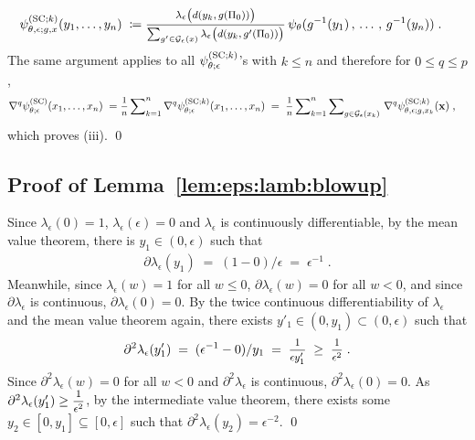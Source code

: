 \begin{align*}
    \psiSCk_{\theta,\epsilon;g,x}
    (y_1, \ldots, y_n)
    \;\coloneqq&\;
    \mfrac{
        \lambda_\epsilon
        \big(  d( y_k, g(\Pi_0)) \big) 
    }{
        \sum_{g' \in \cG_\epsilon(x)}
        \lambda_\epsilon
        \big(  d( y_k, g'(\Pi_0))  \big) 
    }
    \,
    \psi_\theta( g^{-1}(y_1) \,,\, \ldots \,,\, g^{-1}(y_n) )
    \;.
\end{align*}
The same argument applies to all $\psi^{({\rm SC};k)}_{\theta;\epsilon}$'s with $k \leq n$ and therefore for $0 \leq q \leq p$,
\begin{align*}
    \nabla^q 
    \psiSC_{\theta;\epsilon}(x_1, \ldots, x_n)
    \;=&\;
    \mfrac{1}{n} \msum_{k=1}^n 
    \nabla^q 
    \psiSCk_{\theta;\epsilon}(x_1, \ldots, x_n)
    \;=\;
    \mfrac{1}{n}
    \msum_{k=1}^n
    \msum_{g \in \cG_\epsilon(x_k)}
    \,
    \nabla^q 
    \psiSCk_{\theta,\epsilon;g,x_k}
    (\bx)\;,
\end{align*}
which proves (iii). \qed

\subsection{Proof of Lemma~\ref{lem:eps:lamb:blowup}} 

Since $\lambda_\epsilon(0) = 1$, $\lambda_\epsilon(\epsilon) = 0$ and $\lambda_\epsilon$ is continuously differentiable, by the mean value theorem, there is $y_1 \in (0, \epsilon)$ such that 
\begin{align*}
    \partial\lambda_\epsilon(y_1) \;=\; (1-0)/ \epsilon \;=\; \epsilon^{-1}   \;.
\end{align*}    
Meanwhile, since $\lambda_\epsilon(w) = 1$ for  all $w \leq 0$, $\partial \lambda_\epsilon(w) = 0$ for  all $w < 0$, and since $\partial \lambda_\epsilon$ is continuous, $\partial \lambda_\epsilon(0) = 0$. By the twice continuous differentiability of $\lambda_\epsilon$ and the mean value theorem again, there exists $y'_1 \in (0, y_1) \subset (0, \epsilon)$ such that 
\begin{align*}
    \partial^2 \lambda_\epsilon(y'_1) \;=\; (\epsilon^{-1}-0)/ y_1 \;=\; \mfrac{1}{\epsilon y'_1} \;\geq\; \mfrac{1}{\epsilon^2}  \;.
\end{align*}    
Since $\partial^2 \lambda_\epsilon(w) = 0$ for all $w < 0$ and $\partial^2 \lambda_\epsilon$ is continuous, $\partial^2 \lambda_\epsilon(0) = 0$. As $\partial^2 \lambda_\epsilon(y'_1) \geq  \mfrac{1}{\epsilon^2}$, by the intermediate value theorem, there exists some $y_2 \in [0, y_1] \subseteq [0, \epsilon]$ such that  $\partial^2 \lambda_\epsilon(y_2) = \epsilon^{-2}$. \qed